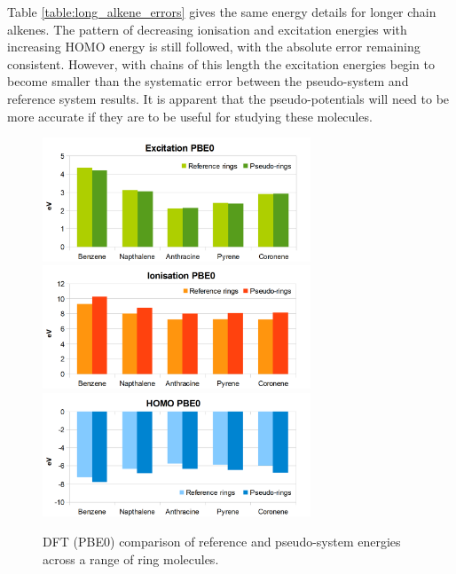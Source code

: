 \documentclass[journal=jctcce,manuscript=article]{achemso}
\begin{document}
Table \ref{table:long_alkene_errors} gives the same energy details for longer chain alkenes. The pattern of decreasing ionisation and excitation energies with increasing HOMO energy is still followed, with the absolute error remaining consistent. However, with chains of this length the excitation energies begin to become smaller than the systematic error between the pseudo-system and reference system results. It is apparent that the pseudo-potentials will need to be more accurate if they are to be useful for studying these molecules.

\begin{figure}[h]
\includegraphics[width=8cm]{ring_pbe0_excitation}
\includegraphics[width=8cm]{ring_pbe0_ionisation}
\includegraphics[width=8cm]{ring_pbe0_homo}
\caption{DFT (PBE0) comparison of reference and pseudo-system energies across a range of ring molecules.}
\label{fig:rings_graphs}
\end{figure}
\end{document}
